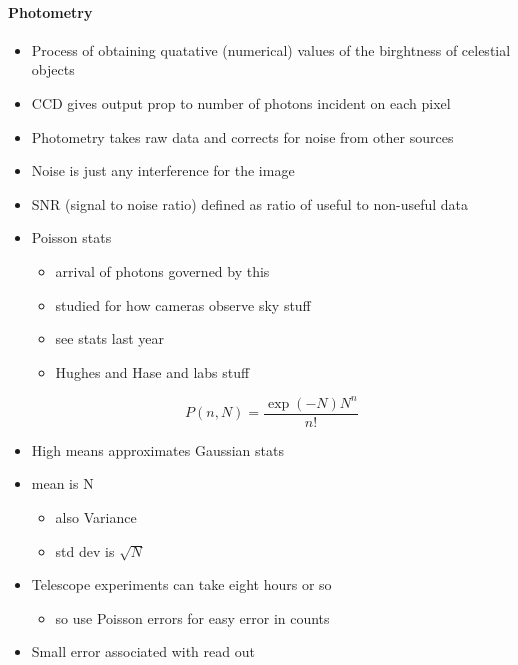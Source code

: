 \documentclass[a4paper,11pt,normalem]{article}
\begin{document}
\paragraph{Photometry}
\begin{itemize}
    \item Process of obtaining quatative (numerical) values of the birghtness of celestial objects
    \item CCD gives output prop to number of photons incident on each pixel
    \item Photometry takes raw data and corrects for noise from other sources
    \item Noise is just any interference for the image
    \item SNR (signal to noise ratio) defined as ratio of useful to non-useful data
    \item Poisson stats
        \begin{itemize}
            \item arrival of photons governed by this
            \item studied for how cameras observe sky stuff
            \item see stats last year
            \item Hughes and Hase and labs stuff
        \end{itemize}
        \begin{equation*}
            P(n,N) = \frac{\exp(-N)N^n}{n!}
        \end{equation*}
    \item High means approximates Gaussian stats
    \item mean is N
        \begin{itemize}
            \item also Variance
            \item std dev is \(\sqrt{N}\)
        \end{itemize}
    \item Telescope experiments can take eight hours or so
        \begin{itemize}
            \item so use Poisson errors for easy error in counts
        \end{itemize}
    \item Small error associated with read out
\end{itemize}
\end{document}
